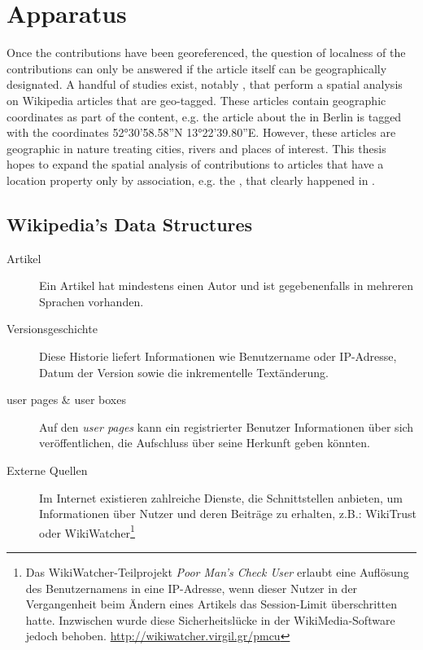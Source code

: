 \chapter{Apparatus}\label{ch:apparatus}

Once the contributions have been georeferenced, the question of localness of the contributions can only be answered if the article itself can be geographically designated. 
A handful of studies exist, notably \cite{hardy2011volunteered,hecht2010localness}, that perform a spatial analysis on Wikipedia articles that are geo-tagged.
These articles contain geographic coordinates as part of the content, e.g. the article about the  in Berlin is tagged with the coordinates 52°30'58.58''N 13°22'39.80''E.
However, these articles are geographic in nature treating cities, rivers and places of interest. 
This thesis hopes to expand the spatial analysis of contributions to articles that have a location property only by association, e.g. the , that clearly happened in .



\section{Wikipedia's Data Structures}

\begin{description}
\item[Artikel] Ein Artikel hat mindestens einen Autor und ist gegebenenfalls in mehreren Sprachen vorhanden.
\item[Versionsgeschichte] Diese Historie liefert Informationen wie Benutzername oder IP-Adresse, Datum der Version sowie die inkrementelle Textänderung.
\item[user pages \& user boxes] Auf den \emph{user pages} kann ein registrierter Benutzer Informationen über sich veröffentlichen, die Aufschluss über seine Herkunft geben könnten.
\item[Externe Quellen] Im Internet existieren zahlreiche Dienste, die Schnittstellen anbieten, um Informationen über Nutzer und deren Beiträge zu erhalten, z.B.: WikiTrust oder WikiWatcher\footnote{Das WikiWatcher-Teilprojekt \emph{Poor Man's Check User} erlaubt eine Auflösung des Benutzernamens in eine IP-Adresse, wenn dieser Nutzer in der Vergangenheit beim Ändern eines Artikels das Session-Limit überschritten hatte. Inzwischen wurde diese Sicherheitslücke in der WikiMedia-Software jedoch behoben. \url{http://wikiwatcher.virgil.gr/pmcu}}
\end{description}

